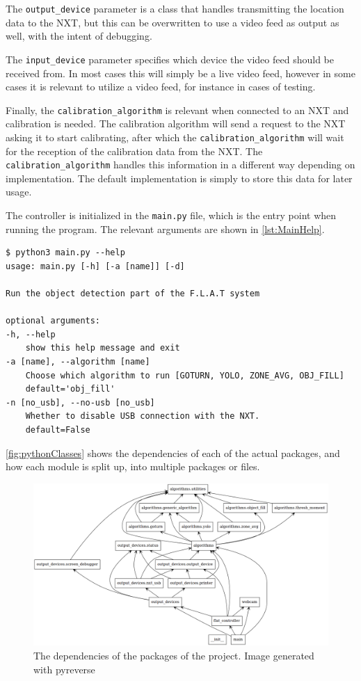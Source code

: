 The \texttt{output\_device} parameter is a class that handles transmitting the location data to the NXT, but this can be overwritten to use a video feed as output as well, with the intent of debugging.

The \texttt{input\_device} parameter specifies which device the video feed should be received from. 
In most cases this will simply be a live video feed, however in some cases it is relevant to utilize a video feed, for instance in cases of testing.

Finally, the \texttt{calibration\_algorithm} is relevant when connected to an NXT and calibration is needed. 
The calibration algorithm will send a request to the NXT asking it to start calibrating, after which the \texttt{calibration\_algorithm} will wait for the reception of the calibration data from the NXT. 
The \texttt{calibration\_algorithm} handles this information in a different way depending on implementation.
The default implementation is simply to store this data for later usage.

The controller is initialized in the \texttt{main.py} file, which is the entry point when running the program. 
The relevant arguments are shown in \autoref{lst:MainHelp}.
\begin{lstlisting}[label={lst:MainHelp},caption={The help message of the commandline interface}]
$ python3 main.py --help
usage: main.py [-h] [-a [name]] [-d]

Run the object detection part of the F.L.A.T system

optional arguments:
-h, --help            
	show this help message and exit
-a [name], --algorithm [name] 
	Choose which algorithm to run [GOTURN, YOLO, ZONE_AVG, OBJ_FILL]
	default='obj_fill'
-n [no_usb], --no-usb [no_usb]
	Whether to disable USB connection with the NXT.
	default=False
\end{lstlisting}
\autoref{fig:pythonClasses} shows the dependencies of each of the actual packages, and how each module is split up, into multiple packages or files.

\begin{figure}[H]
	\centering
	\includegraphics[width=\textwidth]{5.Solution/images/python_packages.png}
	\caption{The dependencies of the packages of the project{.} Image generated with pyreverse\cite{pyreverse}}
	\label{fig:pythonClasses}
\end{figure}


